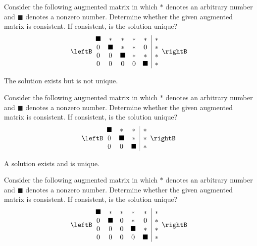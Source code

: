 \begin{enumialphparenastyle}

\begin{ex}
\label{Chapter1Q8}Consider the following augmented matrix in which $\ast $ denotes an
arbitrary number and $\blacksquare $ denotes a nonzero number. Determine
whether the given augmented matrix is consistent. If consistent, is the
solution unique? 
\begin{equation*}
\leftB
\begin{array}{ccccc|c}
\blacksquare & \ast & \ast & \ast & \ast & \ast \\
0 & \blacksquare & \ast & \ast & 0 & \ast \\
0 & 0 & \blacksquare & \ast & \ast & \ast \\
0 & 0 & 0 & 0 & \blacksquare & \ast
\end{array}
\rightB
\end{equation*}
\begin{sol}
The solution exists but is not unique.
\end{sol}
\end{ex}

\begin{ex}
Consider the following augmented matrix in which $\ast $ denotes an arbitrary
number and $\blacksquare $ denotes a nonzero number. Determine whether the
given augmented matrix is consistent. If consistent, is the solution unique?
\begin{equation*}
\leftB
\begin{array}{ccc|c}
\blacksquare & \ast & \ast & \ast \\
0 & \blacksquare & \ast & \ast \\
0 & 0 & \blacksquare & \ast
\end{array}
\rightB
\end{equation*}
\begin{sol}
A solution exists and is unique.
\end{sol}
\end{ex}


\begin{ex}
Consider the following augmented matrix in which $\ast $ denotes an arbitrary
number and $\blacksquare $ denotes a nonzero number. Determine whether the
given augmented matrix is consistent. If consistent, is the solution unique? 
\begin{equation*}
\leftB
\begin{array}{ccccc|c}
\blacksquare & \ast & \ast & \ast & \ast & \ast \\
0 & \blacksquare & 0 & \ast & 0 & \ast \\
0 & 0 & 0 & \blacksquare & \ast & \ast \\
0 & 0 & 0 & 0 & \blacksquare & \ast
\end{array}
\rightB
\end{equation*}
\end{ex}


\end{enumialphparenastyle}
